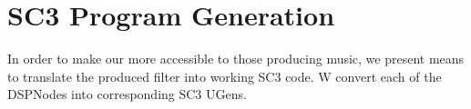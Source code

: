\section{SC3 Program Generation}

In order to make our \ourTool more accessible to those producing music, 
we present means to translate the produced filter into working SC3 code.
W convert each of the DSPNodes into corresponding SC3 UGens.
